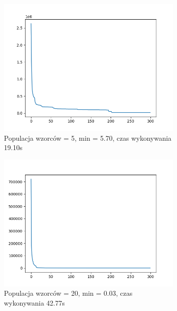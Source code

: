 \documentclass[12pt]{article}
\begin{document}
\begin{figure}[H]
    \centering
    \begin{subfigure}{0.32\textwidth}
        \centering
        \includegraphics[width=\linewidth]{plots/c4.png}
        \caption{Populacja wzorców = 5, min = 5.70, czas wykonywania 19.10s}
    \end{subfigure}
    \begin{subfigure}{0.32\textwidth}
        \centering
        \includegraphics[width=\linewidth]{plots/c5.png}
        \caption{Populacja wzorców = 20, min = 0.03, czas wykonywania 42.77s}
    \end{subfigure}
    \begin{subfigure}{0.32\textwidth}
        \centering

\end{subfigure}
\end{figure}
\end{document}
